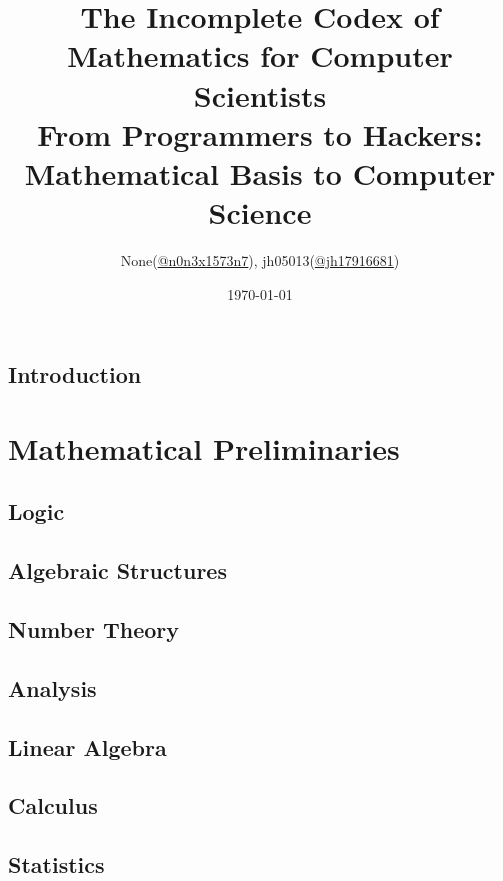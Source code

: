 \documentclass{report}
\title{
	The Incomplete Codex of Mathematics for Computer Scientists\\
	\large From Programmers to Hackers: Mathematical Basis to Computer Science
}
\author{None(\href{https://www.twitter.com/n0n3x1573n7}{@n0n3x1573n7}), jh05013(\href{https://twitter.com/jh17916681}{@jh17916681})}
\date{\today}
\theoremstyle{break}
\begin{document}
	\maketitle

	\chapter{Introduction}
		
	
	\tableofcontents
	
	\part{Mathematical Preliminaries}
	
		\chapter{Logic}
		    

		\chapter{Algebraic Structures}
		    
	
		\chapter{Number Theory}
		    
	
		\chapter{Analysis}
		    
		
		\chapter{Linear Algebra}
		    
		
		\chapter{Calculus}
		    
		
		\chapter{Statistics}
		    
			
\end{document}
